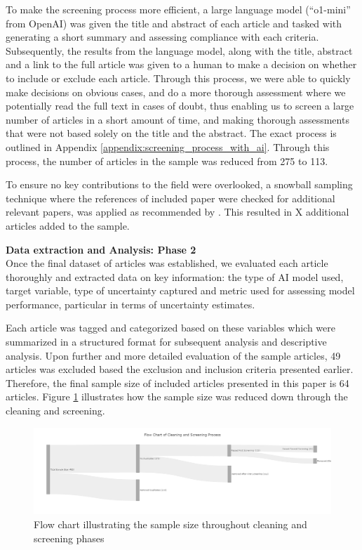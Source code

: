 To make the screening process more efficient, a large language model (``o1-mini'' from OpenAI) was given the title and abstract of each article and tasked with generating a short summary and assessing compliance with each criteria. Subsequently, the results from the language model, along with the title, abstract and a link to the full article was given to a human to make a decision on whether to include or exclude each article. Through this process, we were able to quickly make decisions on obvious cases, and do a more thorough assessment where we potentially read the full text in cases of doubt, thus enabling us to screen a large number of articles in a short amount of time, and making thorough assessments that were not based solely on the title and the abstract. The exact process is outlined in Appendix \ref{appendix:screening_process_with_ai}. Through this process, the number of articles in the sample was reduced from 275 to 113.

To ensure no key contributions to the field were overlooked, a snowball sampling technique where the references of included paper were checked for additional relevant papers, was applied as recommended by \textcite{marzi_et_al_2024}. This resulted in X additional articles added to the sample. 


\textbf{Data extraction and Analysis: Phase 2 } \\
Once the final dataset of articles was established, we evaluated each article thoroughly and extracted data on key information: the type of AI model used, target variable, type of uncertainty captured and metric used for assessing model performance, particular in terms of uncertainty estimates. 

Each article was tagged and categorized based on these variables which were summarized in a structured format for subsequent analysis and descriptive analysis. Upon further and more detailed evaluation of the sample articles, 49 articles was excluded based the exclusion and inclusion criteria presented earlier. 
Therefore, the final sample size of included articles presented in this paper is 64 articles. Figure \ref{fig:screening_and_cleaning_funnel} illustrates how the sample size was reduced down through the cleaning and screening. 

  \begin{figure}[H]
      \centering
      \includegraphics[width=1\linewidth]{Images/screening_funnel.png}
      \caption{Flow chart illustrating the sample size throughout cleaning and screening phases}
      \label{fig:screening_and_cleaning_funnel}
  \end{figure}


